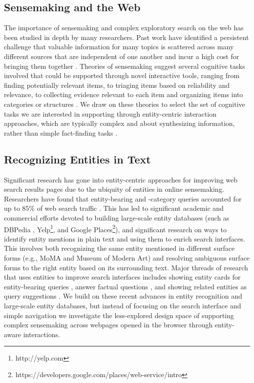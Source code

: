 \subsection{Sensemaking and the Web}

The importance of sensemaking and complex exploratory search on the web has been studied in depth by many researchers. Past work have identified a persistent challenge that valuable information for many topics is scattered across many different sources that are independent of one another and incur a high cost for bringing them together \cite{bhavnani2005difficult,mar2006exp,marshall1999introducing,kittur2013costs}. Theories of sensemaking suggest several cognitive tasks involved that could be supported through novel interactive tools, ranging from finding potentially relevant items, to triaging items based on reliability and relevance, to collecting evidence relevant to each item and organizing items into categories or structures \cite{russell1993cost, takayama2008tracing, hearst2013sewing}. We draw on these theories to select the set of cognitive tasks we are interested in supporting through entity-centric interaction approaches, which are typically complex and about synthesizing information, rather than simple fact-finding tasks \cite{mar2006exp, white2006supporting}.

\subsection{Recognizing Entities in Text}

Significant research has gone into entity-centric approaches for improving web search results pages due to the ubiquity of entities in online sensemaking. Researchers have found that entity-bearing and -category queries accounted for up to 85\% of web search traffic \cite{guo2009named,lin2012active}. This has led to significant academic and commercial efforts devoted to building large-scale entity databases (such as DBPedia \cite{dbpedia}, Yelp\footnote{http://yelp.com}, and Google Places\footnote{https://developers.google.com/places/web-service/intro}), and significant research on ways to identify entity mentions in plain text \cite{spotlight} and using them to enrich search interfaces. This involves both recognizing the same entity mentioned in different surface forms (e.g., MoMA and Museum of Modern Art) and resolving ambiguous surface forms to the right entity based on its surrounding text. Major threads of research that uses entities to improve search interfaces includes showing entity cards for entity-bearing queries \cite{bota,miliaraki2015selena}, answer factual questions  \cite{D15-1038}, and showing related entities as query suggestions \cite{blanco2013entity, bordino2013penguins,klouche2015designing}. We build on these recent advances in entity recognition and large-scale entity databases, but instead of focusing on the search interface and simple navigation we investigate the less-explored design space of supporting complex sensemaking across webpages opened in the browser through entity-aware interactions.


